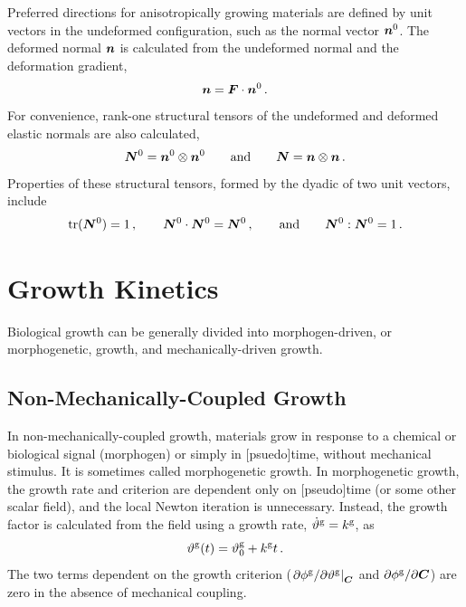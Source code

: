 \documentclass[10pt,letterpaper,oneside]{report}
\newcommand{\ten}[1]{\mbox{\boldmath $#1$}{}}
\newcommand{\scas}[1]{\mbox{{\scriptsize{${\rm{#1}}$}}}{}}
\newcommand{\tens}[1]{\mbox{\boldmath{\scriptsize{$#1$}}}{}}
\begin{document}
Preferred directions for anisotropically growing materials are defined by unit vectors in the undeformed configuration, such as the normal vector $\ten{n}^0$.  The deformed normal $\ten{n}$ is calculated from the undeformed normal and the deformation gradient,
\begin{equation}
\ten{n} = \ten{F} \cdot \ten{n}^0 \, . 
\end{equation}
For convenience, rank-one structural tensors of the undeformed and deformed elastic normals are also calculated, 
\begin{equation}
\ten{N}^0 = \ten{n}^0 \otimes \ten{n}^0 
\qquad \mbox{and} \qquad 
\ten{N} = \ten{n} \otimes \ten{n} \, .
\end{equation}
Properties of these structural tensors, formed by the dyadic of two unit vectors, include
\begin{equation}
\mbox{tr} (\ten{N}^0) = 1 \, , \qquad
\ten{N}^0 \cdot \ten{N}^0 = \ten{N}^0 \, , \qquad \mbox{and} \qquad
\ten{N}^0 : \ten{N}^0 = 1 \, .
\end{equation}


\section{Growth Kinetics}
\label{kinetics}
Biological growth can be generally divided into morphogen-driven, or morphogenetic, growth, and mechanically-driven growth.  

\subsection{Non-Mechanically-Coupled Growth}
In non-mechanically-coupled growth, materials grow in response to a chemical or biological signal (morphogen) or simply in [psuedo]time, without mechanical stimulus.  It is sometimes called morphogenetic growth.  In morphogenetic growth, the growth rate and criterion are dependent only on [pseudo]time (or some other scalar field), and the local Newton iteration is unnecessary.  Instead, the growth factor is calculated from the field using a growth rate, $\dot{\vartheta}^{\scas{g}} = k^{\scas{g}}$, as
\begin{equation}
\vartheta^{\scas{g}} (t) = \vartheta^{\scas{g}}_0 + k^{\scas{g}} t \, . 
\end{equation}
The two terms dependent on the growth criterion ($ \left. \partial \phi^{\scas{g}} / \partial \vartheta^{\scas{g}} \right|_{\tens{C}} $ and $ \partial \phi^{\scas{g}} / \partial \ten{C} $) are zero in the absence of mechanical coupling.
\end{document}
